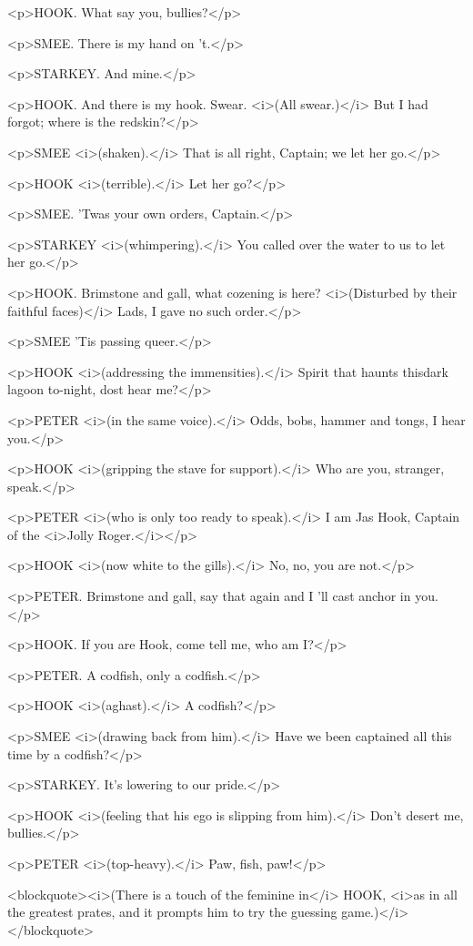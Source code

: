<p>HOOK. What say you, bullies?</p>

<p>SMEE. There is my hand on 't.</p>

<p>STARKEY. And mine.</p>

<p>HOOK. And there is my hook. Swear. <i>(All swear.)</i> But I had forgot; where is the redskin?</p>

<p>SMEE <i>(shaken).</i> That is all right, Captain; we let her go.</p>

<p>HOOK <i>(terrible).</i> Let her go?</p>

<p>SMEE. 'Twas your own orders, Captain.</p>

<p>STARKEY <i>(whimpering).</i> You called over the water to us to let her go.</p>

<p>HOOK. Brimstone and gall, what cozening is here? <i>(Disturbed by their faithful faces)</i> Lads, I gave no such order.</p>

<p>SMEE 'Tis passing queer.</p>

<p>HOOK <i>(addressing the immensities).</i> Spirit that haunts thisdark lagoon to-night, dost hear me?</p>

<p>PETER <i>(in the same voice).</i> Odds, bobs, hammer and tongs, I hear you.</p>

<p>HOOK <i>(gripping the stave for support).</i> Who are you, stranger, speak.</p>

<p>PETER <i>(who is only too ready to speak).</i> I am Jas Hook, Captain of the <i>Jolly Roger.</i></p>

<p>HOOK <i>(now white to the gills).</i> No, no, you are not.</p>

<p>PETER. Brimstone and gall, say that again and I 'll cast anchor in you.</p>

<p>HOOK. If you are Hook, come tell me, who am I?</p>

<p>PETER. A codfish, only a codfish.</p>

<p>HOOK <i>(aghast).</i> A codfish?</p>

<p>SMEE <i>(drawing back from him).</i> Have we been captained all this time by a codfish?</p>

<p>STARKEY. It's lowering to our pride.</p>

<p>HOOK <i>(feeling that his ego is slipping from him).</i> Don't desert me, bullies.</p>

<p>PETER <i>(top-heavy).</i> Paw, fish, paw!</p>

<blockquote><i>(There is a touch of the feminine in</i> HOOK, <i>as in all the greatest prates, and it prompts him to try the guessing game.)</i></blockquote>

